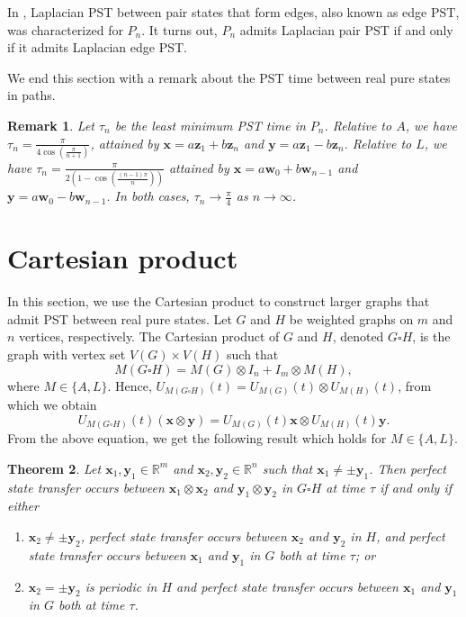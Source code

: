 \documentclass[11pt]{article}
\newtheorem{theorem}{Theorem}
\newtheorem{remark}[theorem]{Remark}
\newcommand{\bx}{\mathbf x}
\newcommand{\by}{\mathbf y}
\newcommand{\bz}{\mathbf z}
\newcommand{\bw}{\mathbf w}
\def\R{\mathbb{R}}
\begin{document}
In \cite{Chen2020PairST}, Laplacian PST between pair states that form edges, also known as edge PST, was characterized for $P_n$. It turns out, $P_n$ admits Laplacian pair PST if and only if it admits Laplacian edge PST.

We end this section with a remark about the PST time between real pure states in paths.

\begin{remark}
\label{pstimepath}
Let $\tau_n$ be the least minimum PST time in $P_n$. Relative to $A$, we have $\tau_n=\frac{\pi}{4\cos(\frac{\pi}{n+1})}$, attained by $\bx=a\bz_1+b\bz_{n}$ and $\by=a\bz_1-b\bz_{n}$.
Relative to $L$, we have $\tau_n=\frac{\pi}{2\left(1-\cos\left(\frac{\left(n-1\right)\pi}{n}\right)\right)}$ attained by $\bx=a\bw_0+b\bw_{n-1}$ and $\by=a\bw_0-b\bw_{n-1}$.
In both cases, $\tau_n\rightarrow \frac{\pi}{4}$ as $n\rightarrow\infty$.
\end{remark}

\section{Cartesian product}\label{Sec:cartprod}

In this section, we use the Cartesian product to construct larger graphs that admit PST between real pure states. Let $G$ and $H$ be weighted graphs on $m$ and $n$ vertices, respectively. The Cartesian product of $G$ and $H$, denoted $G\square H$, is the graph with vertex set $V(G)\times V(H)$ such that $$M(G\square H)=M(G)\otimes I_n+I_m\otimes M(H),$$
where $M\in\{A,L\}$. Hence, $U_{M(G\square H)}(t)=U_{M(G)}(t)\otimes U_{M(H)}(t)$, from which we obtain $$U_{M(G\square H)}(t)(\bx\otimes \by)=U_{M(G)}(t)\bx\otimes U_{M(H)}(t)\by.$$
From the above equation, we get the following result which holds for $M\in\{A,L\}$.

\begin{theorem}
\label{Thm:cartprod}
Let $\bx_1,\by_1\in \R^m$ and $\bx_2,\by_2\in \R^n$ such that $\bx_1\neq \pm \by_1$. Then perfect state transfer occurs between $\bx_1\otimes \bx_2$ and $\by_1\otimes \by_2$ in $G\square H$ at time $\tau$ if and only if either
\begin{enumerate}
\item $\bx_2\neq \pm \by_2$, perfect state transfer occurs between $\bx_2$ and $\by_2$ in $H$, and perfect state transfer occurs between $\bx_1$ and $\by_1$ in $G$ both at time $\tau$; or
\item $\bx_2=\pm \by_2$ is periodic in $H$ and perfect state transfer occurs between $\bx_1$ and $\by_1$ in $G$ both at time $\tau$.
\end{enumerate}
\end{theorem}
\end{document}
